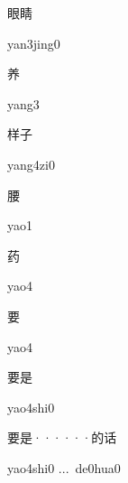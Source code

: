 \begin{verbete}{眼睛}
\begin{pronuncia}{yan3jing0}
\end{pronuncia}
\end{verbete}

\begin{verbete}[yang3]{养}
\begin{pronuncia}{yang3}
\end{pronuncia}
\end{verbete}

\begin{verbete}[yang4zi0]{样子}
\begin{pronuncia}{yang4zi0}
\end{pronuncia}
\end{verbete}

\begin{verbete}[yao1]{腰}
\begin{pronuncia}{yao1}
\end{pronuncia}
\end{verbete}

\begin{verbete}[yao4]{药}
\begin{pronuncia}{yao4}
\end{pronuncia}
\end{verbete}

\begin{verbete}[yao4]{要}
\begin{pronuncia}{yao4}
\end{pronuncia}
\end{verbete}

\begin{verbete}{要是}
\begin{pronuncia}{yao4shi0}
\end{pronuncia}
\end{verbete}

\begin{verbete}{要是······的话}
\begin{pronuncia}[\\]{yao4shi0 ...\  de0hua0}
\end{pronuncia}
\end{verbete}

